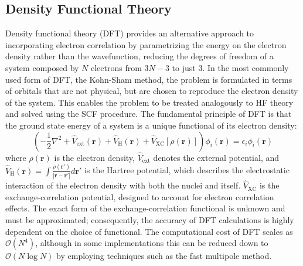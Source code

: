 \subsection{Density Functional Theory}
Density functional theory (DFT)\cite{hohenberg1964density,kohn1965self} provides an alternative approach to incorporating electron correlation by parametrizing the energy on the electron density rather than the wavefunction, reducing the degrees of freedom of a system composed by $N$ electrons from $3N-3$ to just $3$. In the most commonly used form of DFT, the Kohn-Sham method, the problem is formulated in terms of orbitals that are not physical, but are chosen to reproduce the electron density of the system. This enables the problem to be treated analogously to HF theory and solved using the SCF procedure. The fundamental principle of DFT is that the ground state energy of a system is a unique functional of its electron density:
\begin{equation}\label{eq:KSDFT}
    \left( -\frac{1}{2} \nabla^2 + \hat{V}_{\mathrm{ext}}(\mathbf{r}) + \hat{V}_\mathrm{H}(\mathbf{r}) + \hat{V}_{\mathrm{XC}}[\rho(\mathbf{r})] \right) \phi_i(\mathbf{r}) = \epsilon_i \phi_i(\mathbf{r})
\end{equation}
where $\rho(\mathbf{r})$ is the electron density, $\hat{V}_{\mathrm{ext}}$ denotes the external potential, and $\hat{V}_\mathrm{H}(\mathbf{r}) = \int \frac{\rho(\mathbf{r}')}{|\mathbf{r} - \mathbf{r}'|} d\mathbf{r}'$ is the Hartree potential, which describes the electrostatic interaction of the electron density with both the nuclei and itself. $\hat{V}_{\mathrm{XC}}$ is the exchange-correlation potential, designed to account for electron correlation effects. The exact form of the exchange-correlation functional is unknown and must be approximated; consequently, the accuracy of DFT calculations is highly dependent on the choice of functional. The computational cost of DFT scales as $\mathcal{O}(N^4)$, although in some implementations this can be reduced down to $\mathcal{O}(N \log N)$ by employing techniques such as the fast multipole method.

